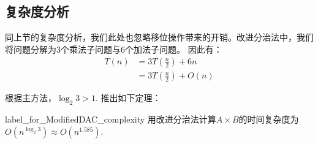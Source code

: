 \subsection{复杂度分析}
同上节的复杂度分析，我们此处也忽略移位操作带来的开销。改进分治法中，我们将问题分解为3个乘法子问题与6个加法子问题。
因此有：
\begin{displaymath}
	\begin{split}
		T(n)
		&= 3T(\frac{n}{2}) + 6n\\
		&= 3T(\frac{n}{2}) + O(n)
	\end{split}
\end{displaymath}

根据主方法，$\log_2 3 > 1$. 推出如下定理：
\begin{theorem}{}{label_for_ModifiedDAC_complexity}
	用改进分治法计算$A \times B$的时间复杂度为$O(n^{\log_2 3}) \approx O(n^{1.585})$.
\end{theorem}
